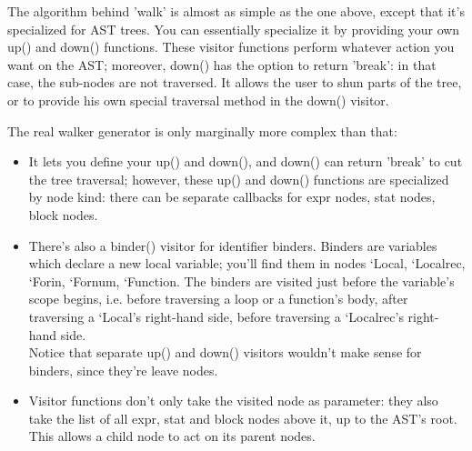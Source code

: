 The algorithm behind 'walk' is almost as simple as the one above, except that
it's specialized for AST trees. You can essentially specialize it by providing
your own up() and down() functions. These visitor functions perform whatever
action you want on the AST; moreover, down() has the option to return 'break':
in that case, the sub-nodes are not traversed. It allows the user to shun parts
of the tree, or to provide his own special traversal method in the down()
visitor.

The real walker generator is only marginally more complex than that:
\begin{itemize}
\item It lets you define your up() and down(), and down() can return 'break' to
  cut the tree traversal; however, these up() and down() functions are
  specialized by node kind: there can be separate callbacks for expr nodes, stat
  nodes, block nodes.
\item There's also a binder() visitor for identifier binders. Binders are
  variables which declare a new local variable; you'll find them in nodes
  `Local, `Localrec, `Forin, `Fornum, `Function. The binders are visited just
  before the variable's scope begins, i.e. before traversing a loop or a
  function's body, after traversing a `Local's right-hand side, before
  traversing a `Localrec's right-hand side. \\ 
  Notice that separate up() and down() visitors wouldn't make sense for
  binders, since they're leave nodes.
\item Visitor functions don't only take the visited node as parameter: they also
  take the list of all expr, stat and block nodes above it, up to the AST's
  root. This allows a child node to act on its parent nodes.
\end{itemize}

